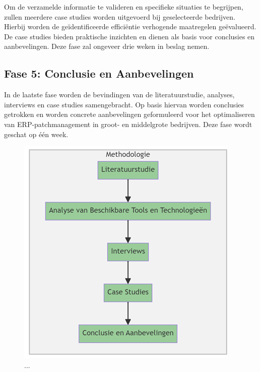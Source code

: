 Om de verzamelde informatie te valideren en specifieke situaties te begrijpen, zullen meerdere case studies worden uitgevoerd bij geselecteerde bedrijven. Hierbij worden de geïdentificeerde efficiëntie verhogende maatregelen geëvalueerd. De case studies bieden praktische inzichten en dienen als basis voor conclusies en aanbevelingen. Deze fase zal ongeveer drie weken in beslag nemen.

\subsection{Fase 5: Conclusie en Aanbevelingen}

In de laatste fase worden de bevindingen van de literatuurstudie, analyses, interviews en case studies samengebracht. Op basis hiervan worden conclusies getrokken en worden concrete aanbevelingen geformuleerd voor het optimaliseren van ERP-patchmanagement in groot- en middelgrote bedrijven. Deze fase wordt geschat op één week.
  
\begin{figure}
    \centering
    \includegraphics[width=\textwidth]{graphics/methodologie.png}
    \caption{...}
    \label{...}
\end{figure}



